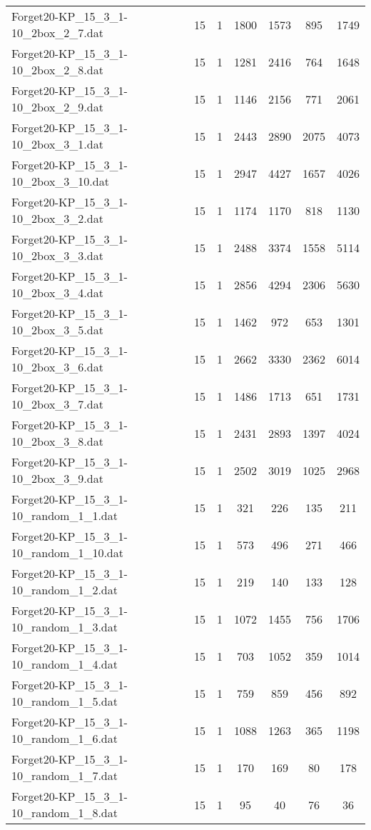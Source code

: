 \begin{table}[!ht]
\begin{tabular}{lcccccc}
Forget20-KP\_15\_3\_1-10\_2box\_2\_7.dat & 15 & 1 & 1800 & 1573 & 895 & 1749 \\
Forget20-KP\_15\_3\_1-10\_2box\_2\_8.dat & 15 & 1 & 1281 & 2416 & 764 & 1648 \\
Forget20-KP\_15\_3\_1-10\_2box\_2\_9.dat & 15 & 1 & 1146 & 2156 & 771 & 2061 \\
Forget20-KP\_15\_3\_1-10\_2box\_3\_1.dat & 15 & 1 & 2443 & 2890 & 2075 & 4073 \\
Forget20-KP\_15\_3\_1-10\_2box\_3\_10.dat & 15 & 1 & 2947 & 4427 & 1657 & 4026 \\
Forget20-KP\_15\_3\_1-10\_2box\_3\_2.dat & 15 & 1 & 1174 & 1170 & 818 & 1130 \\
Forget20-KP\_15\_3\_1-10\_2box\_3\_3.dat & 15 & 1 & 2488 & 3374 & 1558 & 5114 \\
Forget20-KP\_15\_3\_1-10\_2box\_3\_4.dat & 15 & 1 & 2856 & 4294 & 2306 & 5630 \\
Forget20-KP\_15\_3\_1-10\_2box\_3\_5.dat & 15 & 1 & 1462 & 972 & 653 & 1301 \\
Forget20-KP\_15\_3\_1-10\_2box\_3\_6.dat & 15 & 1 & 2662 & 3330 & 2362 & 6014 \\
Forget20-KP\_15\_3\_1-10\_2box\_3\_7.dat & 15 & 1 & 1486 & 1713 & 651 & 1731 \\
Forget20-KP\_15\_3\_1-10\_2box\_3\_8.dat & 15 & 1 & 2431 & 2893 & 1397 & 4024 \\
Forget20-KP\_15\_3\_1-10\_2box\_3\_9.dat & 15 & 1 & 2502 & 3019 & 1025 & 2968 \\
Forget20-KP\_15\_3\_1-10\_random\_1\_1.dat & 15 & 1 & 321 & 226 & 135 & 211 \\
Forget20-KP\_15\_3\_1-10\_random\_1\_10.dat & 15 & 1 & 573 & 496 & 271 & 466 \\
Forget20-KP\_15\_3\_1-10\_random\_1\_2.dat & 15 & 1 & 219 & 140 & 133 & 128 \\
Forget20-KP\_15\_3\_1-10\_random\_1\_3.dat & 15 & 1 & 1072 & 1455 & 756 & 1706 \\
Forget20-KP\_15\_3\_1-10\_random\_1\_4.dat & 15 & 1 & 703 & 1052 & 359 & 1014 \\
Forget20-KP\_15\_3\_1-10\_random\_1\_5.dat & 15 & 1 & 759 & 859 & 456 & 892 \\
Forget20-KP\_15\_3\_1-10\_random\_1\_6.dat & 15 & 1 & 1088 & 1263 & 365 & 1198 \\
Forget20-KP\_15\_3\_1-10\_random\_1\_7.dat & 15 & 1 & 170 & 169 & 80 & 178 \\
Forget20-KP\_15\_3\_1-10\_random\_1\_8.dat & 15 & 1 & 95 & 40 & 76 & 36 \\

\end{tabular}
\end{table}
